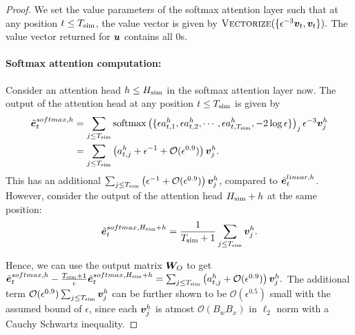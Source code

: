 \begin{proof}
    We set the value parameters of the softmax attention layer such that at any position $t \le T_{\text{sim}}$, the value vector is given by $\textsc{Vectorize}( \{ \epsilon^{-3} {\bm{v}}_t,  {\bm{v}}_t\}).$ The value vector returned for ${\bm{u}}$ contains all $0$s.


    \paragraph{Softmax attention computation:}  Consider an attention head $h \le H_{\text{sim}}$ in the softmax attention layer now. The output of the attention head at any position $t \le T_{\text{sim}}$ is given by
    \begin{align*}
        \Tilde{\ve}^{softmax, h}_t &= \sum_{j \le \simu{T}} \mathrm{softmax}\left( \{  \epsilon a^{h}_{t, 1}, \epsilon a^{h}_{t, 2}, \cdots, \epsilon a^{h}_{t, \simu{T}}, -2 \log \epsilon \} \right)_j \epsilon^{-3} \vv_j^h \\& =  \sum_{j \le \simu{T}} \left( a_{t, j}^h + \epsilon^{-1} + \mathcal{O}(\epsilon^{0.9}) \right) \vv^h_j.
    \end{align*}
    This has an additional $ \sum_{j \le T_{\text{sim}}} \left( \epsilon^{-1} + \mathcal{O}(\epsilon^{0.9}) \right) {\bm{v}}^h_j$, compared to $\Tilde{\ve}^{linear, h}_t$. However, consider the output of the attention head $H_{\text{sim}} + h$ at the same position:
    \begin{align*}
        \Tilde{\ve}^{softmax, \simu{H} +  h}_t = \frac{ 1 }{ \simu{T} + 1 } \sum_{  j \le \simu{T} }   \vv^h_j.
    \end{align*}

    Hence, we can use the output matrix ${\bm{W}}_O$ to get $\Tilde{\ve}^{softmax, h}_t - \frac{\simu{T}+1}{\epsilon} \Tilde{\ve}^{softmax, \simu{H} +  h}_t = \sum_{j \le \simu{T}} \left( a_{t, j}^h + \mathcal{O}(\epsilon^{0.9}) \right) \vv^h_j.$ 
    The additional term $\mathcal{O}(\epsilon^{0.9})\sum_{  j \le T_{\text{sim}} }   {\bm{v}}^h_j$ can be further shown to be $\mathcal{O}(\epsilon^{0.5})$ small with the assumed bound of $\epsilon$, since each $ {\bm{v}}^h_j $ is atmost $\mathcal{O}(B_w B_x)$ in $\ell_2$ norm with a Cauchy Schwartz inequality. 
\end{proof}



